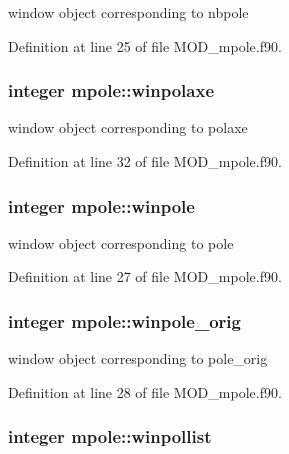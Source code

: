 window object corresponding to nbpole 



Definition at line 25 of file M\-O\-D\-\_\-mpole.\-f90.

\hypertarget{classmpole_a5fc1b199dda9790624e9889904207c3f}{
\subsubsection[{winpolaxe}]{\setlength{\rightskip}{0pt plus 5cm}integer mpole\-::winpolaxe}}\label{classmpole_a5fc1b199dda9790624e9889904207c3f}


window object corresponding to polaxe 



Definition at line 32 of file M\-O\-D\-\_\-mpole.\-f90.

\hypertarget{classmpole_a83c9e5735e6ad5cdc89a646eeec3e672}{
\subsubsection[{winpole}]{\setlength{\rightskip}{0pt plus 5cm}integer mpole\-::winpole}}\label{classmpole_a83c9e5735e6ad5cdc89a646eeec3e672}


window object corresponding to pole 



Definition at line 27 of file M\-O\-D\-\_\-mpole.\-f90.

\hypertarget{classmpole_a3242ee253cbec968b60c695113094204}{
\subsubsection[{winpole\-\_\-orig}]{\setlength{\rightskip}{0pt plus 5cm}integer mpole\-::winpole\-\_\-orig}}\label{classmpole_a3242ee253cbec968b60c695113094204}


window object corresponding to pole\-\_\-orig 



Definition at line 28 of file M\-O\-D\-\_\-mpole.\-f90.

\hypertarget{classmpole_a81b851a05f8ad3f4bc977aa67ef5fdb9}{
\subsubsection[{winpollist}]{\setlength{\rightskip}{0pt plus 5cm}integer mpole\-::winpollist}}\label{classmpole_a81b851a05f8ad3f4bc977aa67ef5fdb9}



